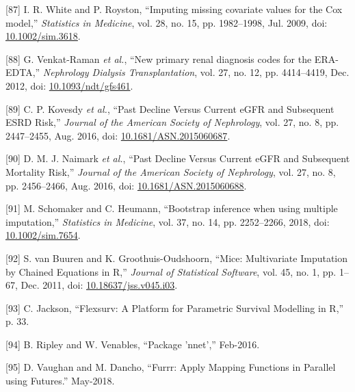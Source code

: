 \documentclass[12pt,PhD,twoside,openright]{muthesis}
\newenvironment{cslreferences}%
  {}%
  {\par}
\begin{document}
\begin{cslreferences}
\leavevmode\hypertarget{ref-white_imputing_2009}{}%
{[}87{]} I. R. White and P. Royston, ``Imputing missing covariate values for the Cox model,'' \emph{Statistics in Medicine}, vol. 28, no. 15, pp. 1982--1998, Jul. 2009, doi: \href{https://doi.org/10.1002/sim.3618}{10.1002/sim.3618}.

\leavevmode\hypertarget{ref-venkat-raman_new_2012}{}%
{[}88{]} G. Venkat-Raman \emph{et al.}, ``New primary renal diagnosis codes for the ERA-EDTA,'' \emph{Nephrology Dialysis Transplantation}, vol. 27, no. 12, pp. 4414--4419, Dec. 2012, doi: \href{https://doi.org/10.1093/ndt/gfs461}{10.1093/ndt/gfs461}.

\leavevmode\hypertarget{ref-kovesdy_past_2016}{}%
{[}89{]} C. P. Kovesdy \emph{et al.}, ``Past Decline Versus Current eGFR and Subsequent ESRD Risk,'' \emph{Journal of the American Society of Nephrology}, vol. 27, no. 8, pp. 2447--2455, Aug. 2016, doi: \href{https://doi.org/10.1681/ASN.2015060687}{10.1681/ASN.2015060687}.

\leavevmode\hypertarget{ref-naimark_past_2016}{}%
{[}90{]} D. M. J. Naimark \emph{et al.}, ``Past Decline Versus Current eGFR and Subsequent Mortality Risk,'' \emph{Journal of the American Society of Nephrology}, vol. 27, no. 8, pp. 2456--2466, Aug. 2016, doi: \href{https://doi.org/10.1681/ASN.2015060688}{10.1681/ASN.2015060688}.

\leavevmode\hypertarget{ref-schomaker_bootstrap_2018}{}%
{[}91{]} M. Schomaker and C. Heumann, ``Bootstrap inference when using multiple imputation,'' \emph{Statistics in Medicine}, vol. 37, no. 14, pp. 2252--2266, 2018, doi: \href{https://doi.org/10.1002/sim.7654}{10.1002/sim.7654}.

\leavevmode\hypertarget{ref-buuren_mice_2011-1}{}%
{[}92{]} S. van Buuren and K. Groothuis-Oudshoorn, ``Mice: Multivariate Imputation by Chained Equations in R,'' \emph{Journal of Statistical Software}, vol. 45, no. 1, pp. 1--67, Dec. 2011, doi: \href{https://doi.org/10.18637/jss.v045.i03}{10.18637/jss.v045.i03}.

\leavevmode\hypertarget{ref-jackson_flexsurv_nodate}{}%
{[}93{]} C. Jackson, ``Flexsurv: A Platform for Parametric Survival Modelling in R,'' p. 33.

\leavevmode\hypertarget{ref-ripley_package_2016}{}%
{[}94{]} B. Ripley and W. Venables, ``Package 'nnet','' Feb-2016.

\leavevmode\hypertarget{ref-vaughan_furrr_2018}{}%
{[}95{]} D. Vaughan and M. Dancho, ``Furrr: Apply Mapping Functions in Parallel using Futures.'' May-2018.


\end{cslreferences}
\end{document}
